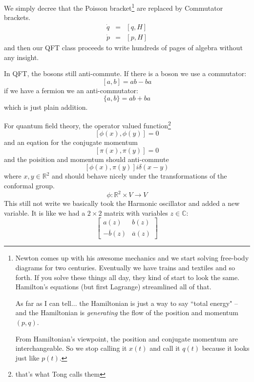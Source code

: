 \documentclass[12pt]{article}
\begin{document}
 We simply decree that the Poisson bracket\footnote{Newton comes up with his awesome mechanics and we start solving free-body diagrams for two centuries.  Eventually we have trains and textiles and so forth.  If you solve these things all day, they kind of start to look the same.  Hamilton's equations (but first Lagrange) streamlined all of that.
 
As far as I can tell... the Hamiltonian is just a way to say ``total energy" -- and the Hamiltonian is \textit{generating} the flow of the position and momentum $(p,q)$.

From Hamiltonian's viewpoint, the position and conjugate momentum are interchangeable.  So we stop calling it $x(t)$ and call it $q(t)$ because it looks just like $p(t)$. } are replaced by Commutator brackets. 
\begin{eqnarray*} \dot{q} &=& [ q, H  ] \\  
\dot{p} &=&  [ p, H  ]  \end{eqnarray*}
and then our QFT class proceeds to write hundreds of pages of algebra without any insight.  \newpage

In QFT, the bosons still anti-commute.  If there is a boson we use a commutator:
$$ [a,b] = ab - ba $$
if we have a fermion we an anti-commutator:
$$ \{ a, b\} = ab + ba $$
which is just plain addition.

\newpage

\noindent For quantum field theory, the operator valued function\footnote{that's what Tong calls them}
$$ [\phi(x), \phi(y)] = 0 $$
and an eqation for the conjugate momentum 
$$ [\pi(x), \pi(y) ] = 0 $$
and the poisition and momentum should anti-commute
$$ [\phi(x), \pi(y) ] i \delta(x-y)$$
where $x, y \in \mathbb{R}^2$ and should behave nicely under the transformations of the conformal group.
$$ \phi: \mathbb{R}^2 \times V \to V $$
This still not write we basically took the Harmonic oscillator and added a new variable.  It is like we had a $2\times 2 $ matrix with variables $z \in \mathbb{C}$:
$$\left[ \begin{array}{rc} 
a(z) & b(z) \\ -\overline{b}(z) & \overline{a}(z) \end{array} \right]$$
\newpage
\end{document}
